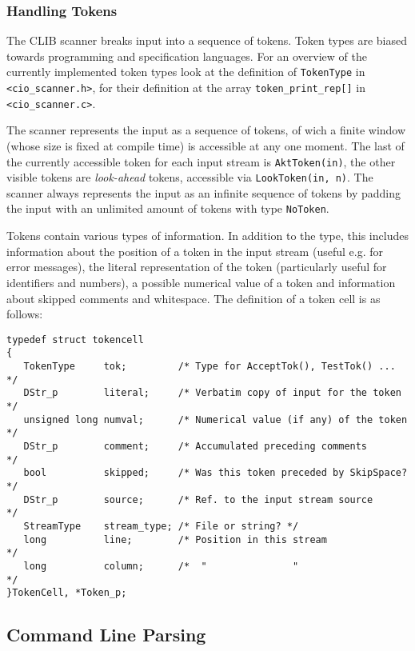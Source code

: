 \subsubsection{Handling Tokens}

The CLIB scanner breaks input into a sequence of tokens. Token types
are biased towards programming and specification languages. For an
overview of the currently implemented token types look at the
definition of \texttt{TokenType} in \texttt{<cio\_scanner.h>}, for
their definition at the array \texttt{token\_print\_rep[]} in
\texttt{<cio\_scanner.c>}.

The scanner represents the input as a sequence of tokens, of wich a
finite window (whose size is fixed at compile time) is accessible at
any one moment. The last of the currently accessible token for each
input stream is \texttt{AktToken(in)}, the other visible tokens are
\emph{look-ahead} tokens, accessible via \texttt{LookToken(in,
  n)}. The scanner always represents the input as an infinite
sequence of tokens by padding the input with an unlimited amount of
tokens with type \texttt{NoToken}.

Tokens contain various types of information. In addition to the type,
this includes information about the position of a token in the input
stream (useful e.g. for error messages), the literal representation of
the token (particularly useful for identifiers and numbers), a
possible numerical value of a token and information about skipped
comments and whitespace. The definition of a token cell is as follows:

\small
\begin{verbatim}
typedef struct tokencell
{
   TokenType     tok;         /* Type for AcceptTok(), TestTok() ...   */
   DStr_p        literal;     /* Verbatim copy of input for the token  */
   unsigned long numval;      /* Numerical value (if any) of the token */
   DStr_p        comment;     /* Accumulated preceding comments        */
   bool          skipped;     /* Was this token preceded by SkipSpace? */
   DStr_p        source;      /* Ref. to the input stream source       */   
   StreamType    stream_type; /* File or string? */
   long          line;        /* Position in this stream               */
   long          column;      /*  "               "                    */
}TokenCell, *Token_p;
\end{verbatim}
\normalsize


\subsection{Command Line Parsing}
\label{sec:io:cl}


